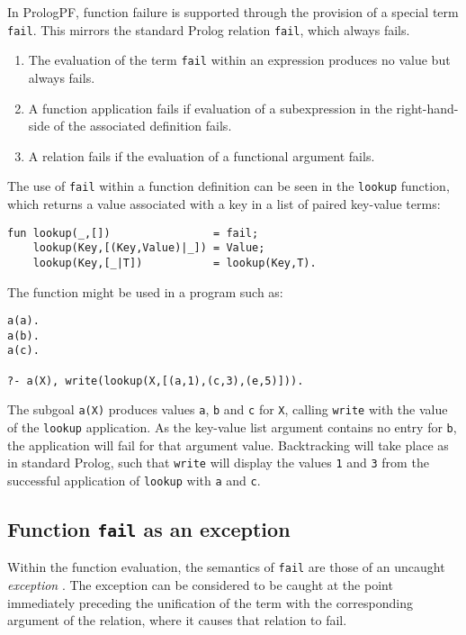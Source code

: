 In PrologPF, function failure is supported through the provision of a
special term \texttt{fail}.
This mirrors the standard Prolog relation \texttt{fail}, which
always fails.
\begin{enumerate}
\item{The evaluation of the term \texttt{fail} within an expression
  produces no value but always fails.}
\item{A function application fails if evaluation of a subexpression
  in the right-hand-side of the associated definition fails.}
\item{A relation fails if the evaluation of a functional argument
  fails.}
\end{enumerate}
The use of \texttt{fail} within a function definition can be seen
in the \texttt{lookup} function, which returns a value associated
with a key in a list of paired key-value terms:
\begin{verbatim}
fun lookup(_,[])                = fail;
    lookup(Key,[(Key,Value)|_]) = Value;
    lookup(Key,[_|T])           = lookup(Key,T).
\end{verbatim}
The function might be used in a program such as:
\begin{verbatim}
a(a).
a(b).
a(c).

?- a(X), write(lookup(X,[(a,1),(c,3),(e,5)])).
\end{verbatim}
The subgoal \texttt{a(X)} produces values \texttt{a},
\texttt{b} and \texttt{c} for \texttt{X}, calling \texttt{write}
with the value of the \texttt{lookup} application.  As the
key-value list argument contains no entry for \texttt{b}, the
application will fail for that argument value.  Backtracking will
take place as in standard Prolog, such that \texttt{write} will
display the values \texttt{1} and \texttt{3} from the successful
application of \texttt{lookup} with \texttt{a} and \texttt{c}.

\subsection{Function \texttt{fail} as an exception}

Within the function evaluation, the semantics of \texttt{fail} are
those of an uncaught \textit{exception} .
The exception can be considered to be caught at the point
immediately preceding the unification of the term with the
corresponding argument of the relation, where it causes that relation
to fail.

